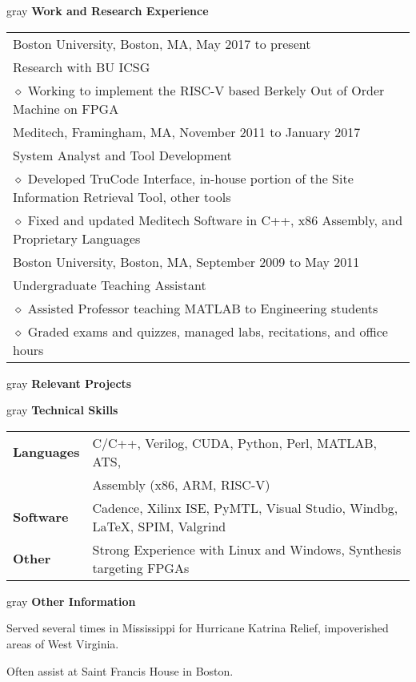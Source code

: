 \documentclass[11pt,letterpaper]{article}
\newcommand{\pseudoitem}{\diamond}
\newcommand{\vertspace}{\vspace{1.2mm}}
\newcommand{\horzindent}{\hspace{3mm}}
\newcommand{\minoritem}{\hspace{4.5mm} $\pseudoitem$ }
\newcommand{\latex}{\LaTeX\space}
\newcommand{\undergrad}{Boston University}
\newcommand{\grad}{Boston University}
\begin{document}
	\vertspace
	\noindent
	\begin{heading}{gray}
		\textbf{Work and Research Experience} 
	\end{heading}
		\begin{tabular}{l}
			\grad , Boston, MA, May 2017 to present\\
			\horzindent Research with BU ICSG\\
			\minoritem Working to implement the RISC-V based Berkely Out of Order Machine on FPGA\\
			Meditech, Framingham, MA, November 2011 to January 2017\\
			\horzindent System Analyst and Tool Development \\
			\minoritem Developed TruCode Interface, in-house portion of the Site Information Retrieval Tool, other tools \\
			\minoritem Fixed and updated Meditech Software in C++, x86 Assembly, and Proprietary Languages \\
			\undergrad , Boston, MA, September 2009 to May 2011 \\
			\horzindent Undergraduate Teaching Assistant \\
			\minoritem Assisted Professor teaching MATLAB to Engineering students \\
			\minoritem Graded exams and quizzes, managed labs, recitations, and office hours \\
		\end{tabular}
		
	\vertspace
	\noindent
	\begin{heading}{gray}
		\textbf{Relevant Projects}
	\end{heading}
	
	\vertspace
	\noindent
	\begin{heading}{gray}
		\textbf{Technical Skills}
	\end{heading}
	\begin{tabular}{l|l}
		\textbf{Languages} & C/C++, Verilog, CUDA, Python, Perl, MATLAB, ATS, \\
		  & Assembly (x86, ARM, RISC-V) \\ \hline %
		\textbf{Software} & Cadence, Xilinx ISE, PyMTL, Visual Studio, Windbg, \latex, SPIM, Valgrind \\ \hline
		\textbf{Other} & Strong Experience with Linux and Windows, Synthesis targeting FPGAs
	\end{tabular}
	
	\vertspace
	\noindent
	\begin{heading}{gray}
		\textbf{Other Information}
	\end{heading}
	Served several times in Mississippi for Hurricane Katrina Relief, impoverished areas of West Virginia.
	
	Often assist at Saint Francis House in Boston.
\end{document}
